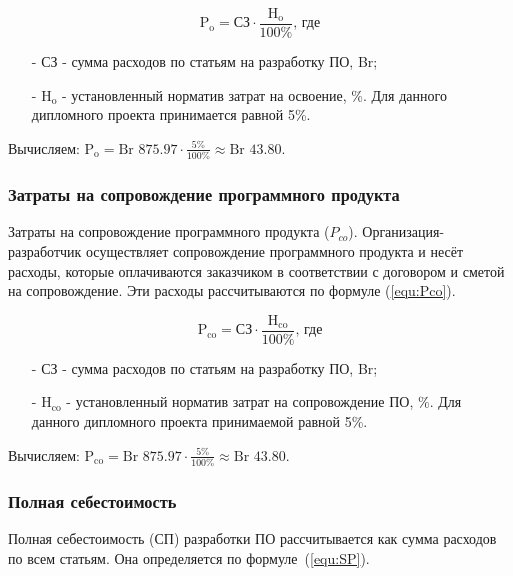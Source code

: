\begin{equation}
    \label{equ:Po}
    \text{P}_\text{o} = \text{СЗ} \cdot \frac{ \text{H}_\text{o} }{ 100\% } \text{, где}
\end{equation}

\begin{enumerate}
    \item[-] $\text{СЗ}$ - сумма расходов по статьям на разработку ПО, Br; 
    \item[-] $\text{H}_\text{o}$ - установленный норматив затрат на освоение, \%. Для данного дипломного проекта принимается равной 5\%.
\end{enumerate}

Вычисляем: $\text{P}_\text{o} = \text{Br }875.97 \cdot \frac{ 5\% }{ 100\% } \approx \text{Br } 43.80$.

\subsubsection*{Затраты на сопровождение программного продукта}

Затраты на сопровождение программного продукта ($P_{co}$).
Организация-разработчик осуществляет сопровождение программного продукта и несёт расходы,
которые оплачиваются заказчиком в соответствии с договором и сметой на сопровождение.
Эти расходы рассчитываются по формуле (\ref{equ:Pco}).

\begin{equation}
    \label{equ:Pco}
    \text{P}_\text{co} = \text{СЗ} \cdot \frac{ \text{H}_\text{co} }{ 100\% } \text{, где}
\end{equation}

\begin{enumerate}
    \item[-] $\text{СЗ}$ - сумма расходов по статьям на разработку ПО, Br; 
    \item[-] $\text{H}_\text{co}$ - установленный норматив затрат на сопровождение ПО, \%. Для данного дипломного проекта принимаемой равной 5\%. 
\end{enumerate}

Вычисляем: $\text{P}_\text{co} = \text{Br }875.97 \cdot \frac{ 5\% }{ 100\% } \approx \text{Br } 43.80$.

\subsubsection*{Полная себестоимость}

Полная себестоимость ($\text{СП}$) разработки ПО рассчитывается как сумма расходов по всем статьям.
Она определяется по формуле~(\ref{equ:SP}). 

